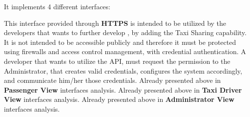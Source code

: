 \begin{itemize}
	It implements 4 different interfaces:
	\begin{itemize}
		 This interface provided through \textbf{HTTPS} is intended to be utilized by the developers that wants to further develop \myTaxiService{}, by adding the Taxi Sharing capability.
		It is not intended to be accessible publicly and therefore it must be protected using firewalls and access control management, with credential authentication.
		A developer that wants to utilize the API, must request the permission to the Administrator, that creates valid credentials, configures the system accordingly, and communicate him/her those credentials.
		 Already presented above in \textbf{Passenger View} interfaces analysis.
		 Already presented above in \textbf{Taxi Driver View} interfaces analysis.
		 Already presented above in \textbf{Administrator View} interfaces analysis.
	\end{itemize}
\end{itemize}
%
